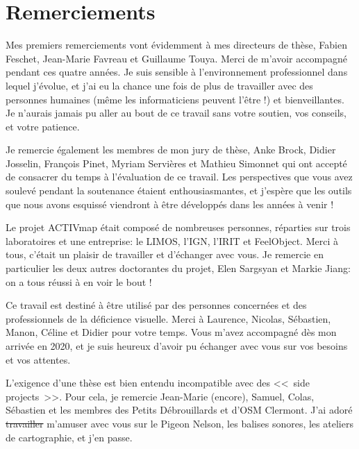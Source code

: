 \chapter*{Remerciements}

Mes premiers remerciements vont évidemment à mes directeurs de thèse, Fabien Feschet, Jean-Marie Favreau et Guillaume Touya. Merci de m'avoir accompagné pendant ces quatre années. Je suis sensible à l'environnement professionnel dans lequel j'évolue, et j'ai eu la chance une fois de plus de travailler avec des personnes humaines (même les informaticiens peuvent l'être !) et bienveillantes. Je n'aurais jamais pu aller au bout de ce travail sans votre soutien, vos conseils, et votre patience.

\newpar{}

Je remercie également les membres de mon jury de thèse, Anke Brock, Didier Josselin, François Pinet, Myriam Servières et Mathieu Simonnet qui ont accepté de consacrer du temps à l'évaluation de ce travail. Les perspectives que vous avez soulevé pendant la soutenance étaient enthousiasmantes, et j'espère que les outils que nous avons esquissé viendront à être développés dans les années à venir !

\newpar{}

Le projet ACTIVmap était composé de nombreuses personnes, réparties sur trois laboratoires et une entreprise: le LIMOS, l'IGN, l'IRIT et FeelObject. Merci à tous, c'était un plaisir de travailler et d'échanger avec vous. Je remercie en particulier les deux autres doctorantes du projet, Elen Sargsyan et Markie Jiang: on a tous réussi à en voir le bout !

\newpar{}

Ce travail est destiné à être utilisé par des personnes concernées et des professionnels de la déficience visuelle. Merci à Laurence, Nicolas, Sébastien, Manon, Céline et Didier pour votre temps. Vous m'avez accompagné dès mon arrivée en 2020, et je suis heureux d'avoir pu échanger avec vous sur vos besoins et vos attentes.

\newpar{}

L'exigence d'une thèse est bien entendu incompatible avec des <<~side projects~>>. Pour cela, je remercie Jean-Marie (encore), Samuel, Colas, Sébastien et les membres des Petits Débrouillards et d'OSM Clermont. J'ai adoré \sout{travailler} m'amuser avec vous sur le Pigeon Nelson, les balises sonores, les ateliers de cartographie, et j'en passe.

\newpar{}


